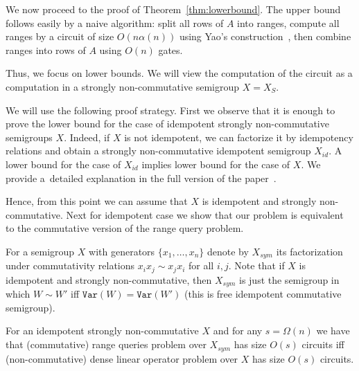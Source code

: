 \documentclass[review,onefignum,onetabnum]{siamart190516}
\newcommand{\var}{\texttt{Var}}
\begin{document}

We now proceed to the proof of Theorem~\ref{thm:lowerbound}.
%
The upper bound follows easily by a naive algorithm: split all rows of $A$ into ranges, compute all ranges by a circuit of size $O(n\alpha(n))$ using Yao's construction~\cite{DBLP:conf/stoc/Yao82}, then combine ranges into rows of $A$ using $O(n)$ gates.

Thus, we focus on lower bounds. We will view the computation of the circuit as a computation in a strongly non-commutative semigroup $X=X_S$.

We will use the following proof strategy.
First we observe that it is enough to prove the lower bound for the case of idempotent strongly non-commutative semigroups $X$. Indeed, if $X$ is not idempotent, we can factorize it by idempotency relations and obtain a strongly non-commutative idempotent semigroup $X_{id}$. A lower bound for the case of $X_{id}$ implies lower bound for the case of $X$. %
We provide a~detailed explanation in
the full version of the paper~\cite{DBLP:journals/eccc/KulikovMMP19}.

Hence, { from this point we can assume that $X$ is idempotent and strongly non-commutative}.
Next for idempotent case we show that our problem is equivalent to the commutative version of the range query problem.

For a semigroup $X$ with generators $\{x_1,\ldots, x_n\}$ denote by $X_{sym}$ its factorization under commutativity relations $x_i x_j \sim x_j x_i$ for all $i,j$. Note that if $X$ is idempotent and strongly non-commutative, then $X_{sym}$ is just the semigroup in which $W \sim W'$ iff $\var(W)=\var(W')$ (this is free idempotent commutative semigroup).

\begin{theorem}\label{thm:equivalence}
For an idempotent strongly non-commutative $X$ and for any $s=\Omega(n)$ we have that (commutative) range queries problem over $X_{sym}$ has size $O(s)$ circuits iff (non-commutative) dense linear operator problem over $X$ has size $O(s)$ circuits.
\end{theorem}
\end{document}
